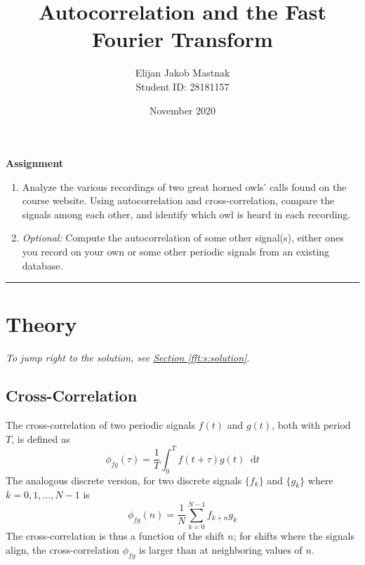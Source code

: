 \documentclass[11pt, a4paper]{article}
\newcommand{\diff}{\mathop{}\!\mathrm{d}} %
\begin{document}
\title{Autocorrelation and the Fast Fourier Transform}
\author{Elijan Jakob Mastnak\\[1mm]\small{Student ID: 28181157}}
\date{November 2020}
\maketitle


\tableofcontents

\newpage
\begin{center}
\textbf{Assignment}
\begin{enumerate}
	\item Analyze the various recordings of two great horned owls' calls found on the course website.  Using autocorrelation and cross-correlation, compare the signals among each other, and identify which owl is heard in each recording. 
	
	\item \textit{Optional:} Compute the autocorrelation of some other signal(s), either ones you record on your own or some other periodic signals from an existing database.
\end{enumerate}
\end{center}

\vspace{2mm}

\rule{\textwidth}{0.2pt}

\section{Theory} \label{fft:s:theory}
\vspace{-2mm}
\textit{To jump right to the solution, see \hyperref[fft:s:solution]{Section \ref{fft:s:solution}}}.

\subsection{Cross-Correlation}
The cross-correlation of two periodic signals $ f(t) $ and $ g(t) $, both with period $ T $, is defined as
\begin{equation*}
	\phi_{fg}(\tau) = \frac{1}{T}\int_{0}^{T}f(t + \tau)g(t) \diff t
\end{equation*}
The analogous discrete version, for two discrete signals $ \{f_{k}\} $ and $ \{g_{k}\} $ where $ k = 0, 1, \ldots, N -1 $ is
\begin{equation*}
	\phi_{fg}(n) = \frac{1}{N}\sum_{k = 0}^{N-1}f_{k+n}g_{k}
\end{equation*}
The cross-correlation is thus a function of the shift $ n $; for shifts where the signals align, the cross-correlation $ \phi_{fg} $ is larger than at neighboring values of $ n $.
\end{document}
